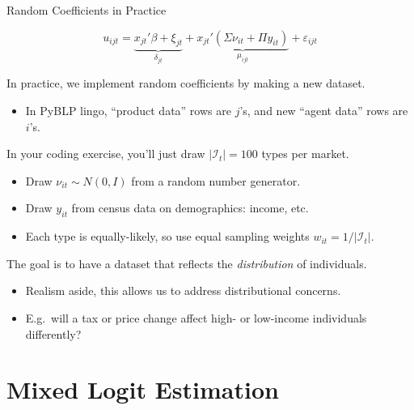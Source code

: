 \documentclass[aspectratio=169,t,11pt,table]{beamer}
\begin{document}
\begin{frame}{Random Coefficients in Practice}
    \vspace{-\baselineskip}
    \begin{minipage}[c][4\baselineskip][c]{\textwidth}
        \begin{equation*}
            u_{ijt} = \underbrace{x_{jt}'\beta + \xi_{jt}}_{\textstyle\delta_{jt}} + \underbrace{x_{jt}'(\Sigma \nu_{it} + \Pi y_{it})}_{\textstyle\mu_{ijt}} + \varepsilon_{ijt}
        \end{equation*}
    \end{minipage}
    \vspace{-0.5\baselineskip}
    \begin{wideitemize}
        \item In practice, we implement random coefficients by making a new dataset.
        \begin{itemize}
            \item In PyBLP lingo, ``product data'' rows are $j$'s, and new ``agent data'' rows are $i$'s.
        \end{itemize}
        \pause
        \item In your coding exercise, you'll just draw $|\mathcal{I}_t| = 100$ types per market.
        \begin{itemize}
            \item Draw $\nu_{it} \sim N(0, I)$ from a random number generator.
            \item Draw $y_{it}$ from census data on demographics: income, etc.
            \item Each type is equally-likely, so use equal sampling weights $w_{it} = 1 / |\mathcal{I}_t|$.
        \end{itemize}
        \pause
        \item The goal is to have a dataset that reflects the \textit{distribution} of individuals.
        \begin{itemize}
            \item Realism aside, this allows us to address distributional concerns.
            \item E.g.\ will a tax or price change affect high- or low-income individuals differently?
        \end{itemize}
    \end{wideitemize}
\end{frame}

\section{Mixed Logit Estimation}
\end{document}
